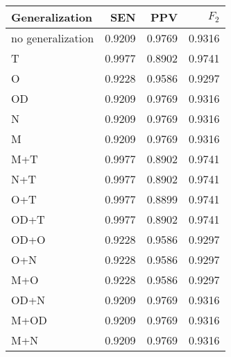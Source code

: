 \begin{table}[htbp]
  \caption{}
  \label{tab:}
  \centering
  \begin{tabular}[h]{@{}lrrr@{}}
    \toprule
    Generalization & SEN & PPV & \(F_2\) \\
    \midrule
no generalization	&	0.9209	&	0.9769	&	0.9316 \\
T	&	0.9977	&	0.8902	&	0.9741 \\
O	&	0.9228	&	0.9586	&	0.9297 \\
OD	&	0.9209	&	0.9769	&	0.9316 \\
N	&	0.9209	&	0.9769	&	0.9316 \\
M	&	0.9209	&	0.9769	&	0.9316 \\
M+T	&	0.9977	&	0.8902	&	0.9741 \\
N+T	&	0.9977	&	0.8902	&	0.9741 \\
O+T	&	0.9977	&	0.8899	&	0.9741 \\
OD+T	&	0.9977	&	0.8902	&	0.9741 \\
OD+O	&	0.9228	&	0.9586	&	0.9297 \\
O+N	&	0.9228	&	0.9586	&	0.9297 \\
M+O	&	0.9228	&	0.9586	&	0.9297 \\
OD+N	&	0.9209	&	0.9769	&	0.9316 \\
M+OD	&	0.9209	&	0.9769	&	0.9316 \\
M+N	&	0.9209	&	0.9769	&	0.9316 \\
    \bottomrule
  \end{tabular}
\end{table}
